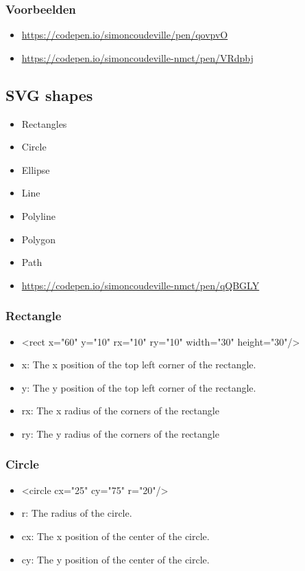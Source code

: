 \documentclass{article}
\begin{document}
\subsubsection{Voorbeelden}
\begin{itemize}
    \item \url{https://codepen.io/simoncoudeville/pen/qovpvO}
    \item \url{https://codepen.io/simoncoudeville-nmct/pen/VRdpbj}
\end{itemize}


\subsection{SVG shapes}
\begin{itemize}
    \item Rectangles
    \item Circle
    \item Ellipse
    \item Line
    \item Polyline
    \item Polygon
    \item Path
    \item \url{https://codepen.io/simoncoudeville-nmct/pen/qQBGLY}
\end{itemize}

\subsubsection{Rectangle}

\begin{itemize}
    \item <rect x="60" y="10" rx="10" ry="10" width="30" height="30"/>
    \item x: The x position of the top left corner of the rectangle.
    \item y: The y position of the top left corner of the rectangle.
    \item rx: The x radius of the corners of the rectangle
    \item ry: The y radius of the corners of the rectangle
\end{itemize}

\subsubsection{Circle}
\begin{itemize}
    \item <circle cx="25" cy="75" r="20"/>
    \item r: The radius of the circle.
    \item cx: The x position of the center of the circle.
    \item cy: The y position of the center of the circle.
\end{itemize}
\end{document}
